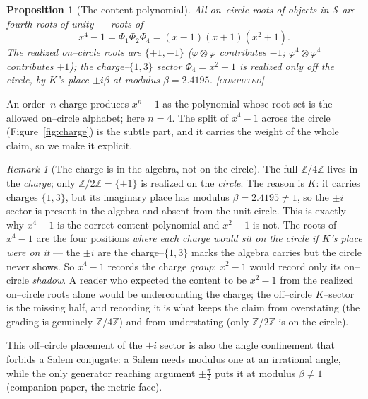 \documentclass[11pt]{article}
\theoremstyle{plain}
\newtheorem{proposition}[theorem]{Proposition}
\theoremstyle{definition}
\theoremstyle{remark}
\newtheorem{remark}[theorem]{Remark}
\newcommand{\computed}{\textcolor{forcedc}{\textsc{[computed]}}}
\newcommand{\Z}{\mathbb{Z}}
\newcommand{\Scal}{\mathcal{S}}
\begin{document}
\begin{proposition}[The content polynomial]\label{prop:content}
All on--circle roots of objects in $\Scal$ are fourth roots of unity --- roots of
\[
x^4-1=\Phi_1\Phi_2\Phi_4=(x-1)(x+1)(x^2+1).
\]
The realized on--circle roots are $\{+1,-1\}$ ($\varphi\otimes\varphi$ contributes $-1$; $\varphi^4\otimes\varphi^4$ contributes $+1$); the charge--$\{1,3\}$ sector $\Phi_4=x^2+1$ is realized only \emph{off} the circle, by $K$'s place $\pm i\beta$ at modulus $\beta=2.4195$. \computed
\end{proposition}

An order--$n$ charge produces $x^n-1$ as the polynomial whose root set is the allowed on--circle alphabet; here $n=4$. The split of $x^4-1$ across the circle (Figure~\ref{fig:charge}) is the subtle part, and it carries the weight of the whole claim, so we make it explicit.

\begin{remark}[The charge is in the algebra, not on the circle]\label{rem:algebra-not-circle}
The full $\Z/4\Z$ lives in the \emph{charge}; only $\Z/2\Z=\{\pm1\}$ is realized on the \emph{circle}. The reason is $K$: it carries charges $\{1,3\}$, but its imaginary place has modulus $\beta=2.4195\neq1$, so the $\pm i$ sector is present in the algebra and absent from the unit circle. This is exactly why $x^4-1$ is the correct content polynomial and $x^2-1$ is not. The roots of $x^4-1$ are the four positions \emph{where each charge would sit on the circle if $K$'s place were on it} --- the $\pm i$ are the charge--$\{1,3\}$ marks the algebra carries but the circle never shows. So $x^4-1$ records the charge \emph{group}; $x^2-1$ would record only its on--circle \emph{shadow}. A reader who expected the content to be $x^2-1$ from the realized on--circle roots alone would be undercounting the charge; the off--circle $K$--sector is the missing half, and recording it is what keeps the claim from overstating (the grading is genuinely $\Z/4\Z$) and from understating (only $\Z/2\Z$ is on the circle).
\end{remark}

This off--circle placement of the $\pm i$ sector is also the angle confinement that forbids a Salem conjugate: a Salem needs modulus one at an irrational angle, while the only generator reaching argument $\pm\tfrac\pi2$ puts it at modulus $\beta\neq1$ (companion paper, the metric face).
\end{document}

